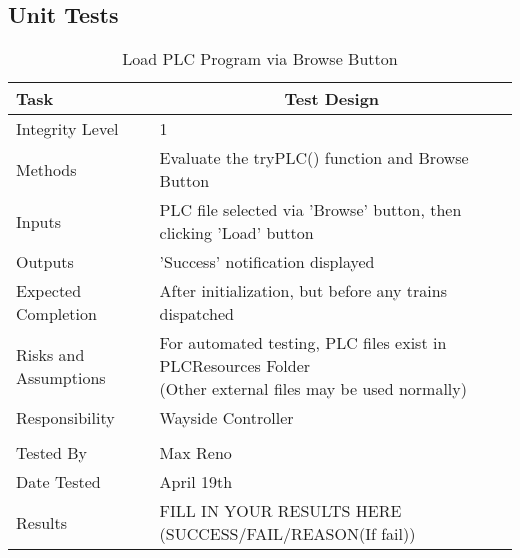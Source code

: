 \documentclass[]{article}
\begin{document}
\subsection{Unit Tests}
\begin{table}[H]
	\centering
	\caption{Load PLC Program via Browse Button}
	\begin{tabular}{|l|l|}
		\hline
		Task & \multicolumn{1}{c|}{Test Design} \\ \hline
		Integrity Level & 1 \\ \hline
		Methods & Evaluate the tryPLC() function and Browse Button\\ \hline
		Inputs &  PLC file selected via 'Browse' button, then clicking 'Load' button \\ \hline
		Outputs &  'Success' notification displayed \\ \hline
		Expected Completion & After initialization, but before any trains dispatched\\ \hline
		Risks and Assumptions & \parbox[t]{10cm}{For automated testing, PLC files exist in PLCResources Folder \\(Other external files may be used normally)}  \\ \hline
		Responsibility & Wayside Controller\\ \hline
		\\ \hline
		Tested By   &  Max Reno\\	\hline
		Date Tested & \parbox[t]{10cm}{April 19th}\\ \hline
		Results & FILL IN YOUR RESULTS HERE (SUCCESS/FAIL/REASON(If fail))\\ \hline
	\end{tabular}
\end{table}
\end{document}
